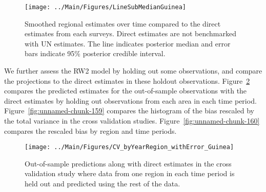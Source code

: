 \documentclass[12pt]{article}\usepackage[]{graphicx}\usepackage[]{color}
\newenvironment{knitrout}{}{} %
\begin{document}
\begin{knitrout}
\color{fgcolor}\begin{figure}[bht]

{\centering \texttt{[image: ../Main/Figures/LineSubMedianGuinea]} 

}

\caption[Smoothed regional estimates over time compared to the direct estimates from each surveys]{Smoothed regional estimates over time compared to the direct estimates from each surveys. Direct estimates are not benchmarked with UN estimates. The line indicates posterior median and error bars indicate 95\% posterior credible interval.}\label{fig:unnamed-chunk-157}
\end{figure}


\end{knitrout}
We further assess the RW2 model by holding out some observations, and compare the projections to the direct estimates in these holdout observations. Figure~\ref{fig:unnamed-chunk-158} compares the predicted estimates for the out-of-sample observations  with the direct estimates by holding out observations from each area in each time period.  Figure~\ref{fig:unnamed-chunk-159} compares the histogram of the bias rescaled by the total variance in the cross validation studies. Figure~\ref{fig:unnamed-chunk-160} compares the rescaled bias by region and time periods.



 
\begin{knitrout}
\color{fgcolor}\begin{figure}[bht]

{\centering \texttt{[image: ../Main/Figures/CV\_byYearRegion\_withError\_Guinea]} 

}

\caption[Out-of-sample predictions along with direct estimates in the cross validation study where data from one region in each time period is held out and predicted using the rest of the data]{Out-of-sample predictions along with direct estimates in the cross validation study where data from one region in each time period is held out and predicted using the rest of the data.}\label{fig:unnamed-chunk-158}
\end{figure}


\end{knitrout}
\end{document}
